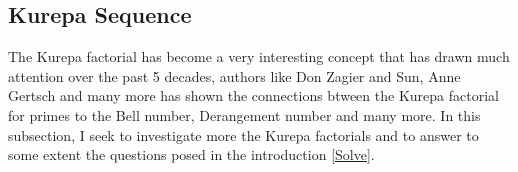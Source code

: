 \documentclass[pdflatex,sn-mathphys-num]{sn-jnl}%
\newtheorem{theorem}{Theorem}
\theoremstyle{thmstyleone}%
\theoremstyle{thmstyletwo}%
\theoremstyle{thmstylethree}%
\begin{document}



\subsection{Kurepa Sequence}
The Kurepa factorial has become a very interesting concept that has drawn much attention over the past 5 decades, authors like Don Zagier and Sun, Anne Gertsch and many more \cite{sun2011curious, gertsch1999congruences, gertsch1996some} has shown the connections btween the Kurepa factorial for primes to the Bell number, Derangement number and many more. In this subsection, I seek to investigate more the Kurepa factorials and to answer to some extent the questions posed in the introduction \ref{Solve}.
\end{document}
